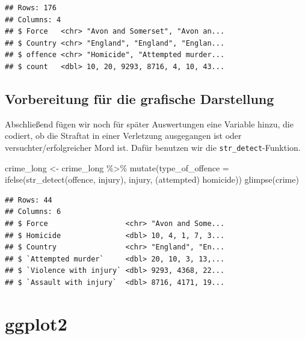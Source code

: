 \documentclass[
]{book}
\newenvironment{Shaded}{\begin{snugshade}}{\end{snugshade}}
\newcommand{\AttributeTok}[1]{\textcolor[rgb]{0.77,0.63,0.00}{#1}}
\newcommand{\FunctionTok}[1]{\textcolor[rgb]{0.00,0.00,0.00}{#1}}
\newcommand{\NormalTok}[1]{#1}
\newcommand{\OtherTok}[1]{\textcolor[rgb]{0.56,0.35,0.01}{#1}}
\newcommand{\SpecialCharTok}[1]{\textcolor[rgb]{0.00,0.00,0.00}{#1}}
\newcommand{\StringTok}[1]{\textcolor[rgb]{0.31,0.60,0.02}{#1}}
\begin{document}
\begin{verbatim}
## Rows: 176
## Columns: 4
## $ Force   <chr> "Avon and Somerset", "Avon an...
## $ Country <chr> "England", "England", "Englan...
## $ offence <chr> "Homicide", "Attempted murder...
## $ count   <dbl> 10, 20, 9293, 8716, 4, 10, 43...
\end{verbatim}

\hypertarget{vorbereitung-fuxfcr-die-grafische-darstellung}{%
\subsection{Vorbereitung für die grafische Darstellung}\label{vorbereitung-fuxfcr-die-grafische-darstellung}}

Abschließend fügen wir noch für später Auswertungen eine Variable hinzu, die codiert, ob die Straftat in einer Verletzung ausgegangen ist oder versuchter/erfolgreicher Mord ist. Dafür benutzen wir die \texttt{str\_detect}-Funktion.

\begin{Shaded}
\begin{Highlighting}[]
\NormalTok{crime\_long }\OtherTok{\textless{}{-}}\NormalTok{ crime\_long }\SpecialCharTok{\%\textgreater{}\%} 
  \FunctionTok{mutate}\NormalTok{(}\AttributeTok{type\_of\_offence =} \FunctionTok{ifelse}\NormalTok{(}\FunctionTok{str\_detect}\NormalTok{(offence, }\StringTok{\textquotesingle{}injury\textquotesingle{}}\NormalTok{),}
                                  \StringTok{\textquotesingle{}injury\textquotesingle{}}\NormalTok{,}
                                  \StringTok{\textquotesingle{}(attempted) homicide\textquotesingle{}}\NormalTok{))}
\FunctionTok{glimpse}\NormalTok{(crime)}
\end{Highlighting}
\end{Shaded}

\begin{verbatim}
## Rows: 44
## Columns: 6
## $ Force                  <chr> "Avon and Some...
## $ Homicide               <dbl> 10, 4, 1, 7, 3...
## $ Country                <chr> "England", "En...
## $ `Attempted murder`     <dbl> 20, 10, 3, 13,...
## $ `Violence with injury` <dbl> 9293, 4368, 22...
## $ `Assault with injury`  <dbl> 8716, 4171, 19...
\end{verbatim}

\hypertarget{ggplot2}{%
\section{ggplot2}\label{ggplot2}}
\end{document}
